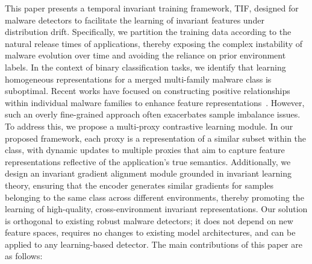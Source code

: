 
This paper presents a temporal invariant training framework, TIF, designed for malware detectors to facilitate the learning of invariant features under distribution drift. Specifically, we partition the training data according to the natural release times of applications, thereby exposing the complex instability of malware evolution over time and avoiding the reliance on prior environment labels. In the context of binary classification tasks, we identify that learning homogeneous representations for a merged multi-family malware class is suboptimal. Recent works have focused on constructing positive relationships within individual malware families to enhance feature representations~\cite{continuous}. However, such an overly fine-grained approach often exacerbates sample imbalance issues. To address this, we propose a multi-proxy contrastive learning module. In our proposed framework, each proxy is a representation of a similar subset within the class, with dynamic updates to multiple proxies that aim to capture feature representations reflective of the application's true semantics. Additionally, we design an invariant gradient alignment module grounded in invariant learning theory, ensuring that the encoder generates similar gradients for samples belonging to the same class across different environments, thereby promoting the learning of high-quality, cross-environment invariant representations. Our solution is orthogonal to existing robust malware detectors; it does not depend on new feature spaces, requires no changes to existing model architectures, and can be applied to any learning-based detector. The main contributions of this paper are as follows:

